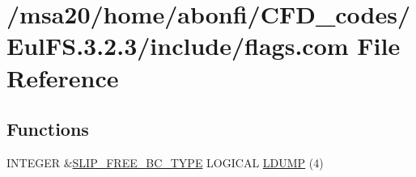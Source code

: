 \hypertarget{msa20_2home_2abonfi_2_c_f_d__codes_2_eul_f_s_83_82_83_2include_2flags_8com}{\section{/msa20/home/abonfi/\-C\-F\-D\-\_\-codes/\-Eul\-F\-S.3.2.3/include/flags.com File Reference}
\label{msa20_2home_2abonfi_2_c_f_d__codes_2_eul_f_s_83_82_83_2include_2flags_8com}
}
\subsection*{Functions}
\begin{DoxyCompactItemize}
\item 
I\-N\-T\-E\-G\-E\-R \&\hyperlink{home_2abonfi_2_c_f_d__codes_2_eul_f_s_83_84_2include_2flags_8com_a6beb6f16ff7301fc1f9a031b0f564045}{S\-L\-I\-P\-\_\-\-F\-R\-E\-E\-\_\-\-B\-C\-\_\-\-T\-Y\-P\-E} L\-O\-G\-I\-C\-A\-L \hyperlink{msa20_2home_2abonfi_2_c_f_d__codes_2_eul_f_s_83_82_83_2include_2flags_8com_a5511347c4c6b9531948f284c335dd6b2}{L\-D\-U\-M\-P} (4)
\end{DoxyCompactItemize}
